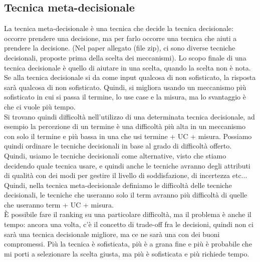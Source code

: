 \documentclass{article}
\begin{document}
\subsection{Tecnica meta-decisionale}
La tecnica meta-decisionale è una tecnica che decide la tecnica decisionale: occorre prendere una decisione, ma per farlo occorre una tecnica che aiuti a prendere la decisione. (Nel paper allegato (file zip), ci sono diverse tecniche decisionali, proposte prima della scelta dei meccanismi). Lo scopo finale di una tecnica decisionale è quello di aiutare in una scelta, quando la scelta non è nota. Se alla tecnica decisionale si da come input qualcosa di non sofisticato, la risposta sarà qualcosa di non sofisticato. Quindi, si migliora usando un meccanismo più sofisticato in cui si passa il termine, lo use case e la misura, ma lo svantaggio è che ci vuole più tempo.\\ Si trovano quindi difficoltà nell'utilizzo di una determinata tecnica decisionale, ad esempio la percezione di un termine è una difficoltà più alta in un meccanismo con solo il termine e più bassa in una che usi termine + UC + misura. Possiamo quindi ordinare le tecniche decisionali in base al grado di difficoltà offerto. Quindi, usiamo le tecniche decisionali come alternative, visto che stiamo decidendo quale tecnica usare, e quindi anche le tecniche avranno degli attributi di qualità con dei modi per gestire il livello di soddisfazione, di incertezza etc...\\ Quindi, nella tecnica meta-decisionale definiamo le difficoltà delle tecniche decisionali, le tecniche che useranno solo il term avranno più difficoltà di quelle che useranno term + UC + misura.\\ È possibile fare il ranking su una particolare difficoltà, ma il problema è anche il tempo: ancora una volta, c'è il concetto di trade-off fra le decisioni, quindi non ci sarà una tecnica decisionale migliore, ma ce ne sarà una con dei buoni compromessi. Più la tecnica è sofisticata, più è a grana fine e più è probabile che mi porti a selezionare la scelta giusta, ma più è sofisticata e più richiede tempo.
\end{document}
